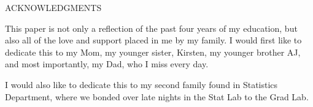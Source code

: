 \begin{center}
ACKNOWLEDGMENTS
\end{center}

This paper is not only a reflection of the past four years of my education, but
also all of the love and support placed in me by my family. I would first like to dedicate
this to my Mom, my younger sister, Kirsten, my younger brother AJ, and most importantly,
my Dad, who I miss every day.

I would also like to dedicate this to my second family found in Statistics Department,
where we bonded over late nights in the Stat Lab to the Grad Lab.

\clearpage

